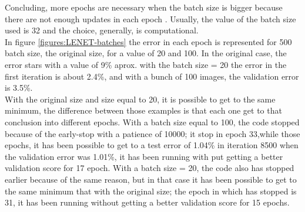 Concluding, more epochs are necessary when the batch size is bigger because there are not enough updates in each epoch \cite{Yoshua}. Usually, the value of the batch size used is 32 \cite{Yoshua} and the choice, generally, is computational.\\

In figure \ref{figures:LENET-batches} the error in each epoch is represented  for 500 batch size, the original size, for a value of 20 and 100. In the original case, the error stars with a value of 9\% aprox. with the batch size = 20 the error in the first iteration is about 2.4\%, and with a bunch of 100 images, the validation error is 3.5\%.\\

With the original size and size equal to 20, it is possible to get to the same minimum, the difference between those examples is that each one get to that conclusion into different epochs. With a batch size equal to 100, the code stopped because of the early-stop with a patience of 10000; it stop in epoch 33,while those epochs, it has been possible to get to a test error of 1.04\% in iteration 8500 when the validation error was 1.01\%, it has been running with put getting a better validation score for 17 epoch. With a batch size = 20, the code also has stopped earlier because of the same reason, but in that case it has been possible to get to the same minimum that with the original size; the epoch in which has stopped is 31, it has been running without getting a better validation score for 15 epochs.\\




